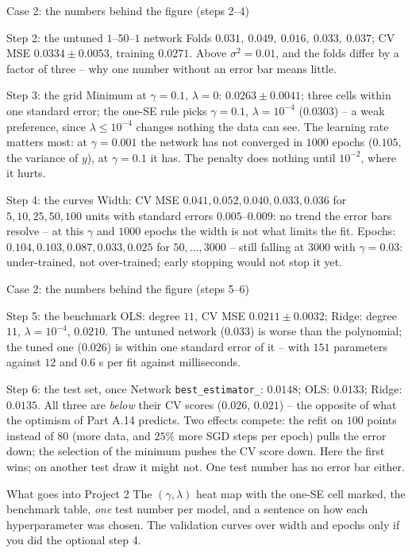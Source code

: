 \documentclass[10pt,aspectratio=169]{beamer}
\begin{document}
\begin{frame}{Case 2: the numbers behind the figure (steps 2--4)}
\small
\begin{block}{Step 2: the untuned $1$--$50$--$1$ network}
Folds $0.031,\ 0.049,\ 0.016,\ 0.033,\ 0.037$; CV MSE $0.0334\pm0.0053$,
training $0.0271$.  Above $\sigma^{2}=0.01$, and the folds differ by a
factor of three -- why one number without an error bar means little.
\end{block}
\begin{block}{Step 3: the grid}
Minimum at $\gamma=0.1$, $\lambda=0$: $0.0263\pm0.0041$; three cells
within one standard error; the one-SE rule picks $\gamma=0.1$,
$\lambda=10^{-4}$ ($0.0303$) -- a weak preference, since $\lambda\le10^{-4}$
changes nothing the data can see.  The learning rate matters most: at
$\gamma=0.001$ the network has not converged in $1000$ epochs ($0.105$,
the variance of $y$), at $\gamma=0.1$ it has.  The penalty does nothing
until $10^{-2}$, where it hurts.
\end{block}
\begin{block}{Step 4: the curves}
Width: CV MSE $0.041,0.052,0.040,0.033,0.036$ for $5,10,25,50,100$ units
with standard errors $0.005$--$0.009$: no trend the error bars resolve --
at this $\gamma$ and $1000$ epochs the width is not what limits the fit.
Epochs: $0.104,0.103,0.087,0.033,0.025$ for $50,\dots,3000$ -- still
falling at $3000$ with $\gamma=0.03$: under-trained, not over-trained;
early stopping would not stop it yet.
\end{block}
\end{frame}

\begin{frame}{Case 2: the numbers behind the figure (steps 5--6)}
\small
\begin{block}{Step 5: the benchmark}
OLS: degree $11$, CV MSE $0.0211\pm0.0032$; Ridge: degree $11$,
$\lambda=10^{-4}$, $0.0210$.  The untuned network ($0.033$) is worse than
the polynomial; the tuned one ($0.026$) is within one standard error of
it -- with $151$ parameters against $12$ and $0.6$ s per fit against
milliseconds.
\end{block}
\begin{block}{Step 6: the test set, once}
Network \texttt{best\_estimator\_}: $0.0148$; OLS: $0.0133$; Ridge:
$0.0135$.  All three are \emph{below} their CV scores ($0.026$, $0.021$)
-- the opposite of what the optimism of Part A.14 predicts.  Two effects
compete: the refit on $100$ points instead of $80$ (more data, and $25\%$
more SGD steps per epoch) pulls the error down; the selection of the
minimum pushes the CV score down.  Here the first wins; on another test
draw it might not.  One test number has no error bar either.
\end{block}
\begin{block}{What goes into Project 2}
The $(\gamma,\lambda)$ heat map with the one-SE cell marked, the benchmark
table, \emph{one} test number per model, and a sentence on how each
hyperparameter was chosen.  The validation curves over width and epochs
only if you did the optional step 4.
\end{block}
\end{frame}
\end{document}
